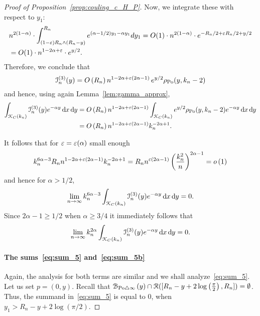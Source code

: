 \begin{proof}[Proof of Proposition~\ref{prop:couling_c_H_P}]
Now, we integrate these with respect to $y_1$:
\begin{align*}
	&n^{2(1-\alpha)} \cdot \int_{(1-\varepsilon) R_n \wedge (R_n-y)}^{R_n} e^{(\alpha -1/2)y_1 - \alpha y_1} dy_1 
		=O(1) \cdot n^{2(1-\alpha)} \cdot e^{-R_n/2 + \varepsilon R_n/2  + y/2}  \\
	&= O(1) \cdot n^{1-2\alpha + \varepsilon} \cdot e^{y/2}.
\end{align*}
Therefore, we conclude that
\[
	\mathcal{I}_n^{(3)}(y) = O\left(R_n\right) n^{1-2\alpha +\varepsilon(2\alpha -1)} \, e^{y/2} \rho_{{\mathrm{Po}}}(y,k_n-2)
\]
and hence, using again Lemma~\ref{lem:gamma_approx},
\begin{align*}
	\int_{{\mathcal K}_{C}(k_n)} \mathcal{I}_n^{(3)}(y) e^{-\alpha y} \operatorname{\mathrm{d}\hspace{-2pt}} x \operatorname{\mathrm{d}\hspace{-2pt}} y
	&= O\left(R_n\right) n^{1-2\alpha +\varepsilon(2\alpha -1)} \int_{{\mathcal K}_{C}(k_n)} e^{y/2} 
		\rho_{{\mathrm{Po}}}(y,k_n-2) e^{-\alpha y} \operatorname{\mathrm{d}\hspace{-2pt}} x \operatorname{\mathrm{d}\hspace{-2pt}} y\\
	&= O\left(R_n\right) n^{1-2\alpha +\varepsilon(2\alpha -1)} k_n^{-2\alpha + 1}.
\end{align*}

It follows that for $\varepsilon = \varepsilon(\alpha)$ small enough
\[
	k_n^{6\alpha - 3} R_n n^{1-2\alpha +\varepsilon(2\alpha -1)} k_n^{-2\alpha + 1}
	= R_n n^{\varepsilon(2\alpha -1)} \left(\frac{k_n^2}{n}\right)^{2\alpha - 1} = o\left(1\right)
\]
and hence for $\alpha > 1/2$,
\[
	\lim_{n \to \infty} k_n^{6\alpha - 3} \int_{{\mathcal K}_{C}(k_n)} \mathcal{I}_n^{(3)}(y) e^{-\alpha y} \operatorname{\mathrm{d}\hspace{-2pt}} x \operatorname{\mathrm{d}\hspace{-2pt}} y = 0.
\]
Since $2\alpha - 1 \ge 1/2$ when $\alpha \ge 3/4$ it immediately follows that
\[
	\lim_{n \to \infty} k_n^{2\alpha} \int_{{\mathcal K}_{C}(k_n)} \mathcal{I}_n^{(3)}(y) e^{-\alpha y} \operatorname{\mathrm{d}\hspace{-2pt}} x \operatorname{\mathrm{d}\hspace{-2pt}} y = 0.
\]

\paragraph{The sums~\eqref{eq:sum_5} and~\eqref{eq:sum_5b}}

Again, the analysis for both terms are similar and we shall analyze~\eqref{eq:sum_5}. Let us set $p=(0,y)$. Recall that ${\mathcal B}_{{\mathrm{Po}} \bigtriangleup \infty}\left(y\right)\cap {\mathcal R}([R_n - y + 2 \log\left(\frac{\pi}{2}\right),R_n]) = \emptyset$. Thus, the summand in~\eqref{eq:sum_5} is equal to 0, when $y_1 > R_n - y + 2 \log (\pi/2)$. 


\end{proof}
